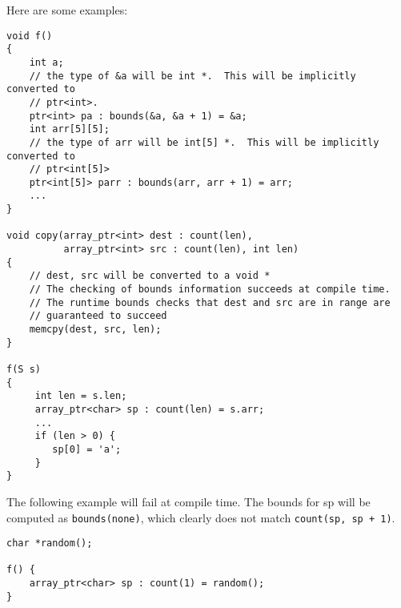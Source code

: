 Here are some examples:
\begin{verbatim}
void f() 
{
    int a;
    // the type of &a will be int *.  This will be implicitly converted to
    // ptr<int>.
    ptr<int> pa : bounds(&a, &a + 1) = &a;
    int arr[5][5];
    // the type of arr will be int[5] *.  This will be implicitly converted to
    // ptr<int[5]> 
    ptr<int[5]> parr : bounds(arr, arr + 1) = arr;
    ...
}

void copy(array_ptr<int> dest : count(len), 
          array_ptr<int> src : count(len), int len)
{
    // dest, src will be converted to a void *
    // The checking of bounds information succeeds at compile time.
    // The runtime bounds checks that dest and src are in range are  
    // guaranteed to succeed
    memcpy(dest, src, len);
}
 
f(S s) 
{
     int len = s.len;
     array_ptr<char> sp : count(len) = s.arr;
     ...
     if (len > 0) {
        sp[0] = 'a';
     }
}
\end{verbatim}

The following example will fail at compile time. The bounds for sp will
be computed as \texttt{bounds(none)}, which clearly does not match
\texttt{count(sp, sp + 1)}.
\begin{verbatim}
char *random();

f() {
    array_ptr<char> sp : count(1) = random(); 
}
\end{verbatim}
